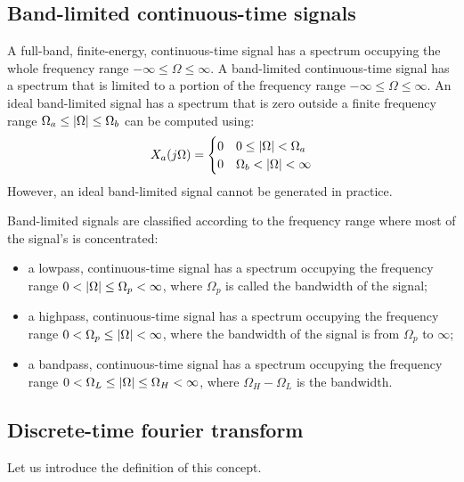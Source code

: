 \documentclass[../../main/main.tex]{subfiles}
\begin{document}
\subsection{Band-limited continuous-time signals}
A full-band, finite-energy, continuous-time signal has a spectrum occupying the whole frequency range \( -\infty \le \Omega \le \infty \). A band-limited continuous-time signal has a spectrum that is
limited to a portion of the frequency range \( -\infty \le \Omega \le \infty \). An ideal band-limited signal has a spectrum that is zero outside a finite frequency range \( \Omega_{a} \le \abs{\Omega} \le \Omega_{b} \) can be computed using:
\begin{equation}
    X_{a}(j\Omega)
    =
    \begin{cases}
        0   &   0 \le \abs{\Omega} < \Omega_{a} \\
        0   &   \Omega_{b} < \abs{\Omega} < \infty
    \end{cases}
    \label{eq:L08_S14_1}
\end{equation}
However, an ideal band-limited signal cannot be generated in practice.

Band-limited signals are classified according to the frequency range where most of the signal's is concentrated:
\begin{itemize}
    \item a lowpass, continuous-time signal has a spectrum occupying the frequency range \( 0 < \abs{\Omega} \le \Omega_{p} < \infty \), where \( \Omega_{p} \) is called the bandwidth of the signal;
    \item a highpass, continuous-time signal has a spectrum occupying the frequency range \( 0 < \Omega_{p} \le \abs{\Omega} < \infty \), where the bandwidth of the signal is from \( \Omega_{p} \) to \( \infty \);
    \item a bandpass, continuous-time signal has a spectrum occupying the frequency range \( 0 < \Omega_{L} \le \abs{\Omega} \le \Omega_{H} < \infty \), where \( \Omega_{H} - \Omega_{L} \) is the bandwidth.
\end{itemize}



\subsection{Discrete-time fourier transform}
Let us introduce the definition of this concept.
\end{document}
